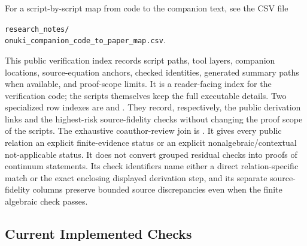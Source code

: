 For a script-by-script map from code to the companion text, see the CSV file
\begin{center}
\small\texttt{research\_notes/}\\
\texttt{onuki\_companion\_code\_to\_paper\_map.csv}.
\end{center}
This public verification index records script paths, tool layers, companion locations,
source-equation anchors, checked identities, generated summary paths when
available, and proof-scope limits.  It is a reader-facing index for the
verification code; the scripts themselves keep the full executable details.
Two specialized row indexes are
 and
.  They record,
respectively, the public derivation links and the highest-risk source-fidelity
checks without changing the proof scope of the scripts.
The exhaustive coauthor-review join is
.  It gives every
public relation an explicit finite-evidence status or an explicit
nonalgebraic/contextual not-applicable status.  It does not convert grouped
residual checks into proofs of continuum statements.  Its check identifiers
name either a direct relation-specific match or the exact enclosing displayed
derivation step, and its separate source-fidelity columns preserve bounded
source discrepancies even when the finite algebraic check passes.

\subsection*{Current Implemented Checks}

